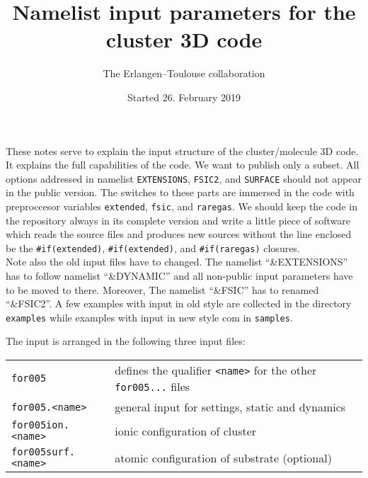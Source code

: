 \documentclass[12pt]{article}
\begin{document}
\title{Namelist input parameters for the cluster 3D code}
\author{The Erlangen--Toulouse collaboration}
\date{Started 26. February 2019}
\maketitle


These notes serve to explain the input structure of the
cluster/molecule 3D code. It explains the full capabilities of the
code. We want to publish only a subset.  All options addressed in
namelist {\tt EXTENSIONS}, {\tt FSIC2}, and {\tt SURFACE} should not
appear in the public version. The switches to these parts are immersed
in the code with preproccesor variables {\tt extended}, {\tt fsic},
and {\tt raregas}. We should keep the code in the repository always in
its complete version and write a little piece of software which reads
the source files and produces new sources without the line enclosed be
the {\tt\#if(extended)}, {\tt\#if(extended)}, and {\tt\#if(raregas)}
closures.
\\
Note also the old input files have to changed. The namelist
``\&EXTENSIONS'' has to follow namelist ``\&DYNAMIC'' and all non-public
input parameters have to be moved to there. Moreover,
The namelist ``\&FSIC'' has to renamed ``\&FSIC2''.
A few examples with input in old style are collected in the directory
{\tt examples} while examples with input in new style com in
{\tt samples}.

\bigskip


The input is arranged in the following three input files:
\\[-28pt]
\begin{center}
\begin{tabular}{ll}
\hline
 {\tt for005} & defines the qualifier {\tt <name>} for 
                the other {\tt for005...} files\\
 {\tt for005.<name>} & general input for settings, static and
 dynamics\\
 {\tt for005ion.<name>} & ionic configuration of cluster\\
 {\tt for005surf.<name>} & atomic configuration of substrate (optional)\\
\hline
\end{tabular}
\end{center}
\end{document}
